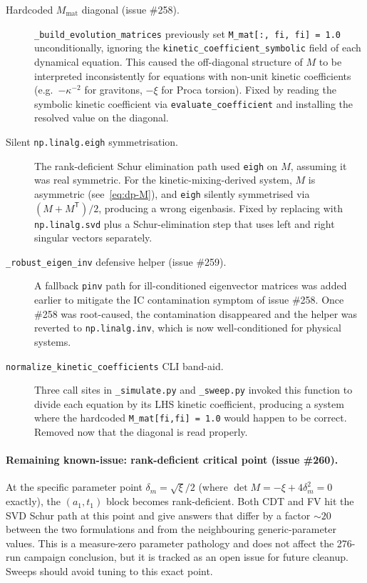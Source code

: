 \begin{description}
  \item[Hardcoded $M_{\mathrm{mat}}$ diagonal (issue \#258).]
    \texttt{\_build\_evolution\_matrices} previously set
    \texttt{M\_mat[:, fi, fi] = 1.0} unconditionally, ignoring the
    \texttt{kinetic\_coefficient\_symbolic} field of each
    dynamical equation. This caused the off-diagonal structure of
    $M$ to be interpreted inconsistently for equations with non-unit
    kinetic coefficients (e.g.\ $-\kappa^{-2}$ for gravitons,
    $-\xi$ for Proca torsion). Fixed by reading the symbolic
    kinetic coefficient via \texttt{evaluate\_coefficient} and
    installing the resolved value on the diagonal.
  \item[Silent \texttt{np.linalg.eigh} symmetrisation.]
    The rank-deficient Schur elimination path used
    \texttt{eigh} on $M$, assuming it was real symmetric. For the
    kinetic-mixing-derived system, $M$ is asymmetric
    (see~\eqref{eq:dp-M}), and \texttt{eigh} silently symmetrised
    via $(M + M^{\mathsf{T}})/2$, producing a wrong eigenbasis.
    Fixed by replacing with \texttt{np.linalg.svd} plus a
    Schur-elimination step that uses left and right singular
    vectors separately.
  \item[\texttt{\_robust\_eigen\_inv} defensive helper (issue \#259).]
    A fallback \texttt{pinv} path for ill-conditioned eigenvector
    matrices was added earlier to mitigate the IC contamination
    symptom of issue \#258. Once \#258 was root-caused, the
    contamination disappeared and the helper was reverted to
    \texttt{np.linalg.inv}, which is now well-conditioned for
    physical systems.
  \item[\texttt{normalize\_kinetic\_coefficients} CLI band-aid.]
    Three call sites in \texttt{\_simulate.py} and
    \texttt{\_sweep.py} invoked this function to divide each
    equation by its LHS kinetic coefficient, producing a system
    where the hardcoded \texttt{M\_mat[fi,fi] = 1.0} would happen
    to be correct. Removed now that the diagonal is read properly.
\end{description}

\paragraph{Remaining known-issue: rank-deficient critical point
(issue \#260).}
At the specific parameter point $\delta_m = \sqrt{\xi}/2$ (where
$\det M = -\xi + 4\delta_m^2 = 0$ exactly), the $(a_1, t_1)$
block becomes rank-deficient. Both CDT and FV hit the SVD Schur
path at this point and give answers that differ by a factor
$\sim 20$ between the two formulations and from the neighbouring
generic-parameter values. This is a measure-zero parameter
pathology and does not affect the 276-run campaign conclusion,
but it is tracked as an open issue for future cleanup. Sweeps
should avoid tuning to this exact point.


